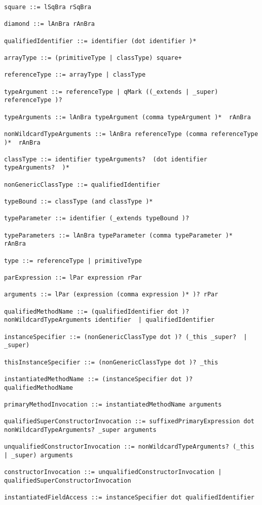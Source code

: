 \begin{lstlisting}[breaklines=true]
square ::= lSqBra rSqBra

diamond ::= lAnBra rAnBra

qualifiedIdentifier ::= identifier (dot identifier )*

arrayType ::= (primitiveType | classType) square+

referenceType ::= arrayType | classType

typeArgument ::= referenceType | qMark ((_extends | _super) referenceType )?

typeArguments ::= lAnBra typeArgument (comma typeArgument )*  rAnBra

nonWildcardTypeArguments ::= lAnBra referenceType (comma referenceType )*  rAnBra

classType ::= identifier typeArguments?  (dot identifier typeArguments?  )*

nonGenericClassType ::= qualifiedIdentifier

typeBound ::= classType (and classType )*

typeParameter ::= identifier (_extends typeBound )?

typeParameters ::= lAnBra typeParameter (comma typeParameter )*  rAnBra

type ::= referenceType | primitiveType

parExpression ::= lPar expression rPar

arguments ::= lPar (expression (comma expression )* )? rPar

qualifiedMethodName ::= (qualifiedIdentifier dot )? nonWildcardTypeArguments identifier  | qualifiedIdentifier

instanceSpecifier ::= (nonGenericClassType dot )? (_this _super?  | _super)

thisInstanceSpecifier ::= (nonGenericClassType dot )? _this

instantiatedMethodName ::= (instanceSpecifier dot )? qualifiedMethodName

primaryMethodInvocation ::= instantiatedMethodName arguments

qualifiedSuperConstructorInvocation ::= suffixedPrimaryExpression dot nonWildcardTypeArguments? _super arguments

unqualifiedConstructorInvocation ::= nonWildcardTypeArguments? (_this | _super) arguments

constructorInvocation ::= unqualifiedConstructorInvocation | qualifiedSuperConstructorInvocation

instantiatedFieldAccess ::= instanceSpecifier dot qualifiedIdentifier


\end{lstlisting}

